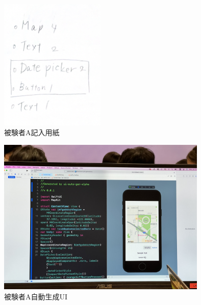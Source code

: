 \begin{figure}[htbp]
  \begin{minipage}{\hsize}
    \begin{center}
       \includegraphics[width=50mm]{img/usertest_viewstructure_1.png}
    \end{center}
    \caption{被験者A記入用紙}
    \label{fig:usertest_viewstructure_1}
  \end{minipage}
\end{figure}

\begin{figure}[htbp]
  \begin{minipage}{\hsize}
    \begin{center}
       \includegraphics[width=100mm]{img/usertest_autogen_1.jpeg}
    \end{center}
    \caption{被験者A自動生成UI}
    \label{fig:usertest_autogen_1}
  \end{minipage}
\end{figure}



